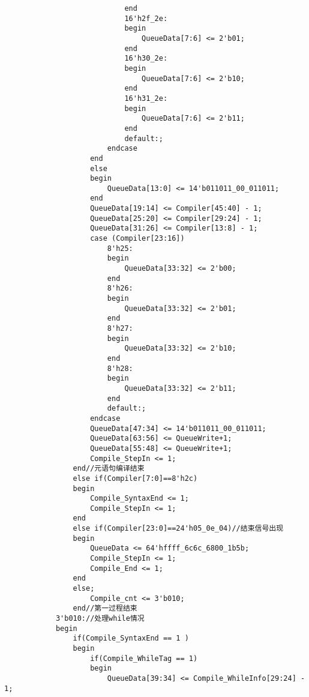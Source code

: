 \documentclass[lang=cn,11pt,a4paper]{elegantpaper}
\begin{document}
\begin{lstlisting}
                            end		
                            16'h2f_2e:
                            begin
                                QueueData[7:6] <= 2'b01;
                            end
                            16'h30_2e:
                            begin
                                QueueData[7:6] <= 2'b10;
                            end
                            16'h31_2e:
                            begin
                                QueueData[7:6] <= 2'b11;
                            end
                            default:;
                        endcase
                    end
                    else
                    begin
                        QueueData[13:0] <= 14'b011011_00_011011;
                    end
                    QueueData[19:14] <= Compiler[45:40] - 1;
                    QueueData[25:20] <= Compiler[29:24] - 1;
                    QueueData[31:26] <= Compiler[13:8] - 1;
                    case (Compiler[23:16])
                        8'h25:
                        begin
                            QueueData[33:32] <= 2'b00;
                        end
                        8'h26:
                        begin
                            QueueData[33:32] <= 2'b01;
                        end
                        8'h27:
                        begin		
                            QueueData[33:32] <= 2'b10;
                        end
                        8'h28:
                        begin
                            QueueData[33:32] <= 2'b11;
                        end
                        default:;
                    endcase
                    QueueData[47:34] <= 14'b011011_00_011011;
                    QueueData[63:56] <= QueueWrite+1;
                    QueueData[55:48] <= QueueWrite+1;
                    Compile_StepIn <= 1;
                end//元语句编译结束
                else if(Compiler[7:0]==8'h2c)
                begin
                    Compile_SyntaxEnd <= 1;
                    Compile_StepIn <= 1;
                end
                else if(Compiler[23:0]==24'h05_0e_04)//结束信号出现
                begin
                    QueueData <= 64'hffff_6c6c_6800_1b5b;
                    Compile_StepIn <= 1;
                    Compile_End <= 1;
                end
                else;
                    Compile_cnt <= 3'b010;
                end//第一过程结束
            3'b010://处理while情况
            begin
                if(Compile_SyntaxEnd == 1 )
                begin
                    if(Compile_WhileTag == 1)
                    begin
                        QueueData[39:34] <= Compile_WhileInfo[29:24] - 1;

\end{lstlisting}
\end{document}
